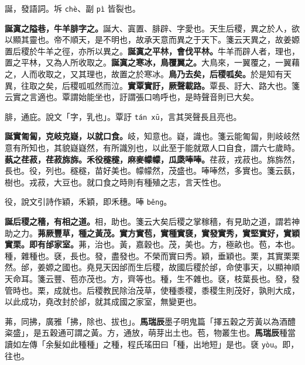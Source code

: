 \begin{quoting}誕，發語詞。坼 \texttt{chè}、副 \texttt{pì} 皆裂也。\end{quoting}

\textbf{誕寘之隘巷，牛羊腓字之。}{\footnotesize 誕大、寘置、腓辟、字愛也。天生后稷，異之於人，欲以顯其靈也。帝不順天，是不明也，故承天意而異之于天下。箋云天異之，故姜嫄置后稷於牛羊之徑，亦所以異之。}\textbf{誕寘之平林，會伐平林。}{\footnotesize 牛羊而辟人者，理也，置之平林，又為人所收取之。}\textbf{誕寘之寒冰，鳥覆翼之。}{\footnotesize 大鳥來，一翼覆之，一翼藉之，人而收取之，又其理也，故置之於寒冰。}\textbf{鳥乃去矣，后稷呱矣。}{\footnotesize 於是知有天異，往取之矣，后稷呱呱然而泣。}\textbf{實覃實訏，厥聲載路。}{\footnotesize 覃長、訏大、路大也。箋云實之言適也。覃謂始能坐也，訏謂張口嗚呼也，是時聲音則已大矣。}

\begin{quoting}腓，通庇。說文「字，乳也」。覃訏 \texttt{tán xū}，言其哭聲長且亮也。\end{quoting}

\textbf{誕實匍匐，克岐克嶷，以就口食。}{\footnotesize 岐，知意也。嶷，識也。箋云能匍匐，則岐岐然意有所知也，其貌嶷嶷然，有所識別也，以此至于能就眾人口自食，謂六七歲時。}\textbf{蓺之荏菽，荏菽旆旆。禾役穟穟，麻麥幪幪，瓜瓞唪唪。}{\footnotesize 荏菽，戎菽也。旆旆然，長也。役，列也。穟穟，苗好美也。幪幪然，茂盛也。唪唪然，多實也。箋云蓺，樹也。戎菽，大豆也。就口食之時則有種殖之志，言天性也。}

\begin{quoting}役，說文引詩作穎，禾穎，即禾穗。唪 \texttt{běng}。\end{quoting}

\textbf{誕后稷之穡，有相之道。}{\footnotesize 相，助也。箋云大矣后稷之掌稼穡，有見助之道，謂若神助之力。}\textbf{茀厥豐草，種之黃茂。實方實苞，實種實褎，實發實秀，實堅實好，實穎實栗。即有邰家室。}{\footnotesize 茀，治也。黃，嘉穀也。茂，美也。方，極畝也。苞，本也。種，雜種也。褎，長也。發，盡發也。不榮而實曰秀。穎，垂穎也。栗，其實栗栗然。邰，姜嫄之國也。堯見天因邰而生后稷，故國后稷於邰，命使事天，以顯神順天命耳。箋云豐、苞亦茂也。方，齊等也。種，生不雜也。褎，枝葉長也。發，發管時也。栗，成就也。后稷教民除治茂草，使種黍稷，黍稷生則茂好，孰則大成，以此成功，堯改封於邰，就其成國之家室，無變更也。}

\begin{quoting}茀，同拂，廣雅「拂，除也、拔也」。\textbf{馬瑞辰}墨子明鬼篇「擇五穀之芳黃以為酒醴粢盛」，是五穀通可謂之黃。方，通放，萌芽出土也。苞，物叢生也。\textbf{馬瑞辰}種當讀如左傳「余髮如此種種」之種，程氏瑤田曰「種，出地短」是也。褎 \texttt{yòu}。即，往也。\end{quoting}


